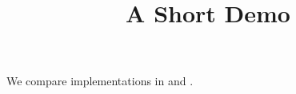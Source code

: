\documentclass[article]{jss}
\title{A Short Demo}
\begin{document}
We compare implementations in  and .
\end{document}
